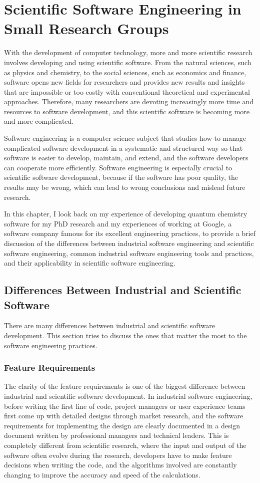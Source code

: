 \chapter{Scientific Software Engineering in Small Research Groups}
With the development of computer technology, more and more scientific research involves developing and using scientific software.
From the natural sciences, such as physics and chemistry, to the social sciences, such as economics and finance, software opens new fields for researchers and provides new results and insights that are impossible or too costly with conventional theoretical and experimental approaches.
Therefore, many researchers are devoting increasingly more time and resources to software development, and this scientific software is becoming more and more complicated.

Software engineering is a computer science subject that studies how to manage complicated software development in a systematic and structured way so that software is easier to develop, maintain, and extend, and the software developers can cooperate more efficiently.
Software engineering is especially crucial to scientific software development, because if the software has poor quality, the results may be wrong, which can lead to wrong conclusions and mislead future research.

In this chapter, I look back on my experience of developing quantum chemistry software for my PhD research and my experiences of working at Google, a software company famous for its excellent engineering practices, to provide a brief discussion of the differences between industrial software engineering and scientific software engineering, common industrial software engineering tools and practices, and their applicability in scientific software engineering.

\section{Differences Between Industrial and Scientific Software}

There are many differences between industrial and scientific software development.
This section tries to discuss the ones that matter the most to the software engineering practices.

\subsection{Feature Requirements}
The clarity of the feature requirements is one of the biggest difference between industrial and scientific software development.
In industrial software engineering, before writing the first line of code, project managers or user experience teams first come up with detailed designs through market research, and the software requirements for implementing the design are clearly documented in a design document written by professional managers and technical leaders.
This is completely different from scientific research, where the input and output of the software often evolve during
the research, developers have to make feature decisions when writing the code, and the algorithms involved are
constantly changing to improve the accuracy and speed of the calculations.

